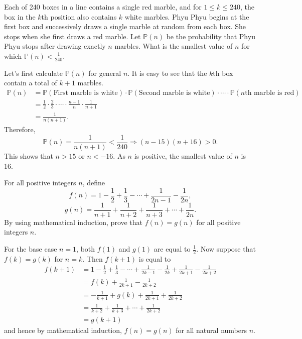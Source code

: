 \begin{question}
    Each of 240 boxes in a line contains a single red marble, and for $1 \leq k
    \leq 240$, the box in the $k$th position also contains $k$ white marbles.
    Phyu Phyu begins at the first box and successively draws a single marble at
    random from each box. She stops when she first draws a red marble. Let
    $\mathbb{P}(n)$ be the probability that Phyu Phyu stops after drawing
    exactly $n$ marbles. What is the smallest value of $n$ for which
    $\mathbb{P}(n) < \frac{1}{240}$. 
\end{question}
\begin{solution}
    Let's first calculate $\mathbb{P}(n)$ for general $n$. It is easy to see
    that the $k$th box contain a total of $k + 1$ marbles.
    \begin{align*}
        \mathbb{P}(n) &= \mathbb{P}(\text{First marble is white}) \cdot \mathbb{P}(\text{Second marble is white}) \cdot \cdots \cdot \mathbb{P}(\text{$n$th marble is red})\\
        &= \frac{1}{2} \cdot \frac{2}{3} \cdot \cdots \cdot \frac{n - 1}{n} \cdot \frac{1}{n + 1}\\
        &= \frac{1}{n(n + 1)}.
    \end{align*}
    Therefore,
    \[ \mathbb{P}(n) = \frac{1}{n(n + 1)} < \frac{1}{240} \Longrightarrow (n -
    15)(n + 16) > 0. \]
    This shows that $n > 15$ or $n < -16$. As $n$ is positive, the smallest
    value of $n$ is 16.
\end{solution}

\begin{question}
    For all positive integers $n$, define 
    \[f(n) = 1 - \frac{1}{2} + \frac{1}{3} - \cdots + \frac{1}{2n-1} -
    \frac{1}{2n},\]
    \[g(n) = \frac{1}{n + 1} + \frac{1}{n + 2} + \frac{1}{n + 3} + \cdots +
    \frac{1}{2n}.\]
    By using mathematical induction, prove that $f(n) = g(n)$ for all positive
    integers $n$.
\end{question}
\begin{solution}
    For the base case $n = 1$, both $f(1)$ and $g(1)$ are equal to
    $\frac{1}{2}$. Now suppose that $f(k) = g(k)$ for $n = k$. Then $f(k + 1)$
    is equal to
    \begin{align*}
        f(k + 1) &= 1 - \frac{1}{2} + \frac{1}{3} - \cdots + \frac{1}{2k - 1} - \frac{1}{2k} + \frac{1}{2k + 1} - \frac{1}{2k + 2}\\
        &= f(k) + \frac{1}{2k + 1} - \frac{1}{2k + 2}\\
        &= - \frac{1}{k + 1} + g(k) + \frac{1}{2k + 1} + \frac{1}{2k + 2}\\
        &= \frac{1}{k + 2} + \frac{1}{k + 3} + \cdots + \frac{1}{2k + 2}\\
        &= g(k + 1)
    \end{align*}
    and hence by mathematical induction, $f(n) = g(n)$ for all natural numbers
    $n$.
\end{solution}

